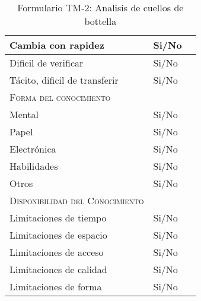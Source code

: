 \begin{table}[H]
{\begin{tabular}{|l|l|l|}
		Cambia con rapidez & \multicolumn{1}{p{1.0cm}|}{Si/No} & \multicolumn{1}{p{13.0cm}|}{}\\
		\hline

		Dificil de verificar & \multicolumn{1}{p{1.0cm}|}{Si/No} & \multicolumn{1}{p{13.0cm}|}{}\\
		\hline

		Tácito, dificil de transferir& \multicolumn{1}{p{1.0cm}|}{Si/No} & \multicolumn{1}{p{13.0cm}|}{}\\
		\hline

		\textsc {Forma del conocimiento}& \multicolumn{1}{p{1.0cm}|}{} & \multicolumn{1}{p{13.0cm}|}{}\\
		\hline

		Mental & \multicolumn{1}{p{1.0cm}|}{Si/No} & \multicolumn{1}{p{13.0cm}|}{}\\
		\hline

		Papel & \multicolumn{1}{p{1.0cm}|}{Si/No} & \multicolumn{1}{p{13.0cm}|}{}\\
		\hline

		Electrónica & \multicolumn{1}{p{1.0cm}|}{Si/No} & \multicolumn{1}{p{13.0cm}|}{}\\
		\hline

		Habilidades & \multicolumn{1}{p{1.0cm}|}{Si/No} & \multicolumn{1}{p{13.0cm}|}{}\\
		\hline

		Otros & \multicolumn{1}{p{1.0cm}|}{Si/No} & \multicolumn{1}{p{13.0cm}|}{}\\
		\hline

		\textsc {Disponibilidad del Conocimiento} & \multicolumn{1}{p{1.0cm}|}{} & \multicolumn{1}{p{13.0cm}|}{}\\
		\hline
		Limitaciones de tiempo& \multicolumn{1}{p{1.0cm}|}{Si/No} & \multicolumn{1}{p{13.0cm}|}{}\\
		\hline

		Limitaciones de espacio& \multicolumn{1}{p{1.0cm}|}{Si/No} & \multicolumn{1}{p{13.0cm}|}{}\\
		\hline

		Limitaciones de acceso& \multicolumn{1}{p{1.0cm}|}{Si/No} & \multicolumn{1}{p{13.0cm}|}{}\\
		\hline

		Limitaciones de calidad& \multicolumn{1}{p{1.0cm}|}{Si/No} & \multicolumn{1}{p{13.0cm}|}{}\\
		\hline

		Limitaciones de forma& \multicolumn{1}{p{1.0cm}|}{Si/No} & \multicolumn{1}{p{13.0cm}|}{}\\
		\hline

	  \end{tabular}
	}
	\caption{\label{tab:TM2}Formulario TM-2: Analisis de cuellos de bottella}
  \end{table}

